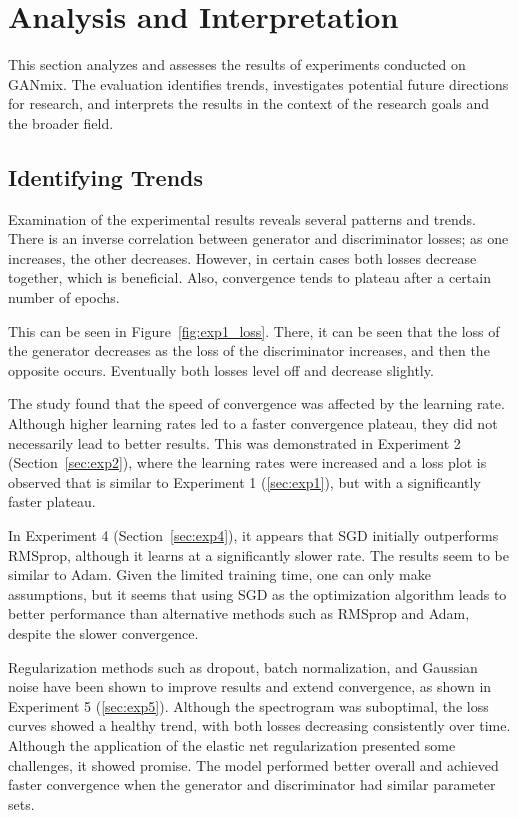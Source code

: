 \section{Analysis and Interpretation} \label{sec:res-analysis}

This section analyzes and assesses the results of experiments conducted on GANmix. The evaluation identifies trends, investigates potential future directions for research, and interprets the results in the context of the research goals and the broader field.

\subsection{Identifying Trends}

Examination of the experimental results reveals several patterns and trends. There is an inverse correlation between generator and discriminator losses; as one increases, the other decreases. However, in certain cases both losses decrease together, which is beneficial. Also, convergence tends to plateau after a certain number of epochs.

This can be seen in Figure~\ref{fig:exp1_loss}. There, it can be seen that the loss of the generator decreases as the loss of the discriminator increases, and then the opposite occurs. Eventually both losses level off and decrease slightly.

The study found that the speed of convergence was affected by the learning rate. Although higher learning rates led to a faster convergence plateau, they did not necessarily lead to better results. This was demonstrated in Experiment 2 (Section~\ref{sec:exp2}), where the learning rates were increased and a loss plot is observed that is similar to Experiment 1 (\ref{sec:exp1}), but with a significantly faster plateau.

In Experiment 4 (Section~\ref{sec:exp4}), it appears that \ac{SGD} initially outperforms RMSprop, although it learns at a significantly slower rate. The results seem to be similar to Adam. Given the limited training time, one can only make assumptions, but it seems that using \ac{SGD} as the optimization algorithm leads to better performance than alternative methods such as RMSprop and Adam, despite the slower convergence.

Regularization methods such as dropout, batch normalization, and Gaussian noise have been shown to improve results and extend convergence, as shown in Experiment 5 (\ref{sec:exp5}). Although the spectrogram was suboptimal, the loss curves showed a healthy trend, with both losses decreasing consistently over time. Although the application of the elastic net regularization presented some challenges, it showed promise. The model performed better overall and achieved faster convergence when the generator and discriminator had similar parameter sets.


